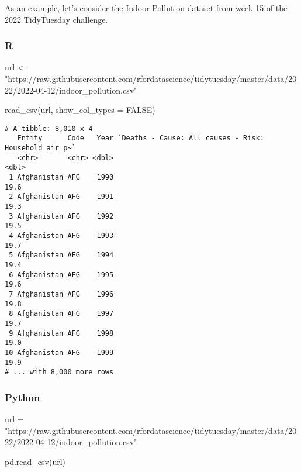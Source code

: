 \documentclass[
  letterpaper,
  DIV=11,
  numbers=noendperiod]{scrreprt}
\newenvironment{Shaded}{\begin{snugshade}}{\end{snugshade}}
\newcommand{\AttributeTok}[1]{\textcolor[rgb]{0.40,0.46,0.14}{#1}}
\newcommand{\ConstantTok}[1]{\textcolor[rgb]{0.56,0.35,0.01}{#1}}
\newcommand{\FunctionTok}[1]{\textcolor[rgb]{0.28,0.35,0.67}{#1}}
\newcommand{\NormalTok}[1]{\textcolor[rgb]{0.00,0.46,0.62}{#1}}
\newcommand{\OperatorTok}[1]{\textcolor[rgb]{0.37,0.37,0.37}{#1}}
\newcommand{\OtherTok}[1]{\textcolor[rgb]{0.00,0.46,0.62}{#1}}
\newcommand{\StringTok}[1]{\textcolor[rgb]{0.13,0.47,0.30}{#1}}
\begin{document}
As an example, let's consider the
\href{https://github.com/rfordatascience/tidytuesday/blob/master/data/2022/2022-04-12}{Indoor
Pollution} dataset from week 15 of the 2022 TidyTuesday challenge.

\hypertarget{r-2}{%
\subsubsection{R}\label{r-2}}

\begin{Shaded}
\begin{Highlighting}[]
\NormalTok{url }\OtherTok{\textless{}{-}} \StringTok{"https://raw.githubusercontent.com/rfordatascience/tidytuesday/master/data/2022/2022{-}04{-}12/indoor\_pollution.csv"}

\FunctionTok{read\_csv}\NormalTok{(url, }\AttributeTok{show\_col\_types =} \ConstantTok{FALSE}\NormalTok{)}
\end{Highlighting}
\end{Shaded}

\begin{verbatim}
# A tibble: 8,010 x 4
   Entity      Code   Year `Deaths - Cause: All causes - Risk: Household air p~`
   <chr>       <chr> <dbl>                                                 <dbl>
 1 Afghanistan AFG    1990                                                  19.6
 2 Afghanistan AFG    1991                                                  19.3
 3 Afghanistan AFG    1992                                                  19.5
 4 Afghanistan AFG    1993                                                  19.7
 5 Afghanistan AFG    1994                                                  19.4
 6 Afghanistan AFG    1995                                                  19.6
 7 Afghanistan AFG    1996                                                  19.8
 8 Afghanistan AFG    1997                                                  19.7
 9 Afghanistan AFG    1998                                                  19.0
10 Afghanistan AFG    1999                                                  19.9
# ... with 8,000 more rows
\end{verbatim}

\hypertarget{python-2}{%
\subsubsection{Python}\label{python-2}}

\begin{Shaded}
\begin{Highlighting}[]
\NormalTok{url }\OperatorTok{=} \StringTok{"https://raw.githubusercontent.com/rfordatascience/tidytuesday/master/data/2022/2022{-}04{-}12/indoor\_pollution.csv"}

\NormalTok{pd.read\_csv(url)}
\end{Highlighting}
\end{Shaded}
\end{document}
